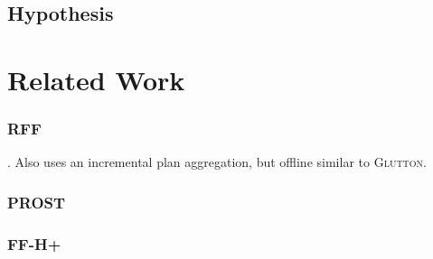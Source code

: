 \documentclass[runningheads,a4paper]{llncs}
\begin{document}
\subsection{Hypothesis}


\section{Related Work}

\subsubsection{RFF}. Also uses an incremental plan aggregation, but offline similar to \textsc{Glutton}.

\subsubsection{PROST}

\subsubsection{FF-H+}

%

\end{document}
